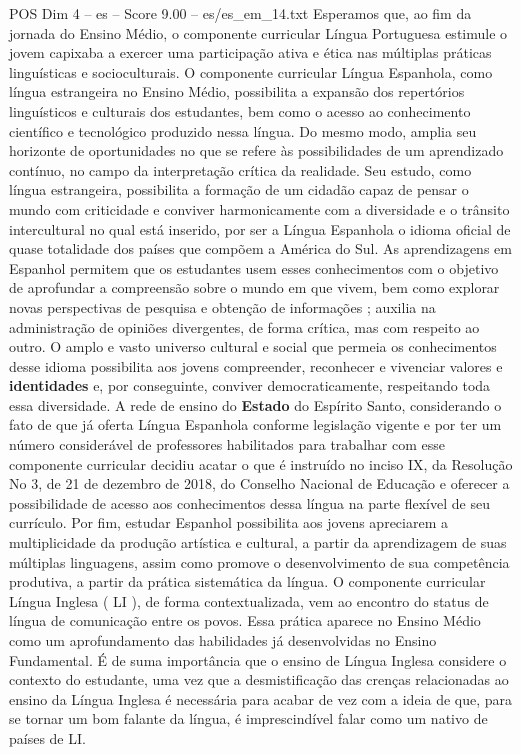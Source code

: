 \begin{textsample}{POS Dim 4 – es – Score 9.00 – es/es\_em\_14.txt}
Esperamos que, ao fim da jornada do Ensino Médio, o componente curricular Língua Portuguesa estimule o jovem capixaba a exercer uma participação ativa e ética nas múltiplas práticas linguísticas e socioculturais.
O componente curricular Língua Espanhola, como língua estrangeira no Ensino Médio, possibilita a expansão dos repertórios linguísticos e culturais dos estudantes, bem como o acesso ao conhecimento científico e tecnológico produzido nessa língua.
Do mesmo modo, amplia seu horizonte de oportunidades no que se refere às possibilidades de um aprendizado contínuo, no campo da interpretação crítica da realidade.
Seu estudo, como língua estrangeira, possibilita a formação de um cidadão capaz de pensar o mundo com criticidade e conviver harmonicamente com a diversidade e o trânsito intercultural no qual está inserido, por ser a Língua Espanhola o idioma oficial de quase totalidade dos países que compõem a América do Sul.
As aprendizagens em Espanhol permitem que os estudantes usem esses conhecimentos com o objetivo de aprofundar a compreensão sobre o mundo em que vivem, bem como explorar novas perspectivas de pesquisa e obtenção de informações ; auxilia na administração de opiniões divergentes, de forma crítica, mas com respeito ao outro.
O amplo e vasto universo cultural e social que permeia os conhecimentos desse idioma possibilita aos jovens compreender, reconhecer e vivenciar valores e \textbf{identidades} e, por conseguinte, conviver democraticamente, respeitando toda essa diversidade.
A rede de ensino do \textbf{Estado} do Espírito Santo, considerando o fato de que já oferta Língua Espanhola conforme legislação vigente e por ter um número considerável de professores habilitados para trabalhar com esse componente curricular decidiu acatar o que é instruído no inciso IX, da Resolução No 3, de 21 de dezembro de 2018, do Conselho Nacional de Educação e oferecer a possibilidade de acesso aos conhecimentos dessa língua na parte flexível de seu currículo.
Por fim, estudar Espanhol possibilita aos jovens apreciarem a multiplicidade da produção artística e cultural, a partir da aprendizagem de suas múltiplas linguagens, assim como promove o desenvolvimento de sua competência produtiva, a partir da prática sistemática da língua.
O componente curricular Língua Inglesa ( LI ), de forma contextualizada, vem ao encontro do status de língua de comunicação entre os povos.
Essa prática aparece no Ensino Médio como um aprofundamento das habilidades já desenvolvidas no Ensino Fundamental.
É de suma importância que o ensino de Língua Inglesa considere o contexto do estudante, uma vez que a desmistificação das crenças relacionadas ao ensino da Língua Inglesa é necessária para acabar de vez com a ideia de que, para se tornar um bom falante da língua, é imprescindível falar como um nativo de países de LI.

\end{textsample}
